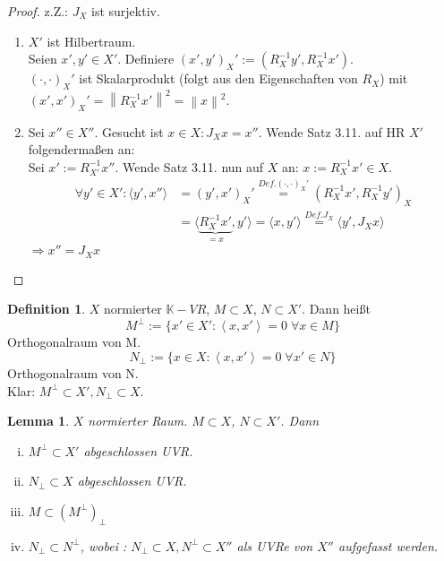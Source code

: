 \documentclass[ngerman]{report}
\theoremstyle{plain}%
\newtheorem{lemma}[thm]{Lemma}
\theoremstyle{definition}%
\newtheorem{definition}[thm]{Definition}
\theoremstyle{myStyle}
\newcommand{\K}{\mathbb{K}}
\newcommand{\norm}[1]{\left \|#1\right\| }
\newcommand{\df}[1][]{%
	\overset{#1}{\Rightarrow}
}
\newcommand{\set}[1]{\{#1\}} %
\newcommand{\fop}[1]{\left \langle #1 \right \rangle} %
\newcommand{\f}[2]{\langle #1,#2 \rangle} %
\begin{document}
	\begin{proof}z.Z.: $J_X$ ist surjektiv.
		\begin{enumerate}[1)]
			\item $X'$ ist Hilbertraum.\\
			Seien $x',y' \in X'$. Definiere $(x',y')_X':=(R^{-1}_X y', R^{-1}_X x')$. \\
			$(\cdot,\cdot)_X'$ ist Skalarprodukt (folgt aus den Eigenschaften von $R_X$) mit $(x',x')_X' = \norm{R^{-1}_X x'}^2 = \norm{x}^2$.
			\item Sei $x'' \in X''$. Gesucht ist $x \in X: J_X x= x''$. Wende Satz 3.11. auf HR $X'$ folgendermaßen an:\\
			Sei $x':= R^{-1}_{X'} x''$. Wende Satz 3.11. nun auf $X$ an:
			$x:= R^{-1}_X x' \in X$.\\
			\begin{align*}
				\forall y' \in X': \f{y'}{x''}&=(y',x')_X' \overset{Def. (\cdot, \cdot)_X'}{=}(R^{-1}_X x', R^{-1}_X y')_X \\
				&= \f{\underbrace{R^{-1}_X x'}_{=x}}{y'}= \f{x}{y'} \overset{Def. J_X}{=}\f{y'}{J_X x} 
			\end{align*}
			$\df x''=J_X x$
		\end{enumerate}
		
	\end{proof}

	\begin{definition}
		$X$ normierter $\K-VR$, $M \subset X$, $N \subset X'$. Dann heißt 
			$$ M^\perp := \set{x' \in X' : \fop{x,x'} = 0 \; \forall x\in M}$$
			Orthogonalraum von M.
			$$ N_\perp := \set{ x\in X : \fop{x,x'} = 0 \; \forall x' \in N}$$
			Orthogonalraum von N. \\
			Klar: $M^\perp \subset X', N_\perp \subset X$.
	\end{definition}

	\begin{lemma}
		$X$ normierter Raum. $M\subset X$, $N \subset X'$. Dann
				\begin{enumerate}[(i)]
					\item $M^\perp \subset X'$ abgeschlossen UVR.
					\item $N_\perp \subset X$ abgeschlossen UVR.
					\item $M \subset (M^\perp)_\perp$
					\item $N_\perp \subset N^\perp$, wobei : $N_\perp \subset X, N^\perp \subset X''$ als UVRe von $X''$ aufgefasst werden.
				\end{enumerate}
	\end{lemma}
\end{document}

